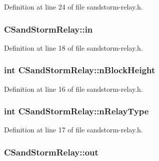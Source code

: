 Definition at line 24 of file sandstorm-\/relay.\+h.

\hypertarget{class_c_sand_storm_relay_af8dcec2c973e41cf6f42cfe4443e3925}{}
\subsubsection[{in}]{ C\+Sand\+Storm\+Relay\+::in}\label{class_c_sand_storm_relay_af8dcec2c973e41cf6f42cfe4443e3925}


Definition at line 18 of file sandstorm-\/relay.\+h.

\hypertarget{class_c_sand_storm_relay_a38fd3f66b75775160f98c85b1c3b81d0}{}
\subsubsection[{n\+Block\+Height}]{\setlength{\rightskip}{0pt plus 5cm}int C\+Sand\+Storm\+Relay\+::n\+Block\+Height}\label{class_c_sand_storm_relay_a38fd3f66b75775160f98c85b1c3b81d0}


Definition at line 16 of file sandstorm-\/relay.\+h.

\hypertarget{class_c_sand_storm_relay_a97f1e8d95b7a6770ce54c9c5835e535f}{}
\subsubsection[{n\+Relay\+Type}]{\setlength{\rightskip}{0pt plus 5cm}int C\+Sand\+Storm\+Relay\+::n\+Relay\+Type}\label{class_c_sand_storm_relay_a97f1e8d95b7a6770ce54c9c5835e535f}


Definition at line 17 of file sandstorm-\/relay.\+h.

\hypertarget{class_c_sand_storm_relay_a3f7d41fd5d3c55dab9e081fe10988f35}{}
\subsubsection[{out}]{ C\+Sand\+Storm\+Relay\+::out}\label{class_c_sand_storm_relay_a3f7d41fd5d3c55dab9e081fe10988f35}


